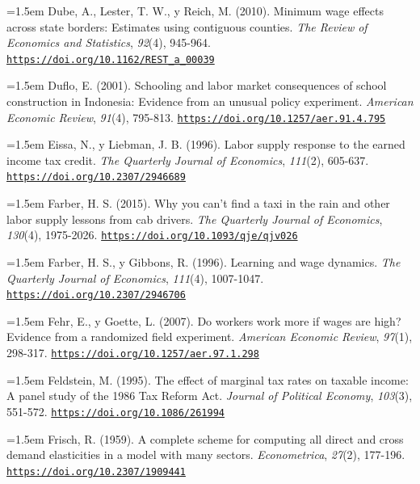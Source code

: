 \documentclass[10pt,a4paper]{article}
\begin{document}
\noindent\hangindent=1.5em Dube, A., Lester, T. W., y Reich, M. (2010). Minimum wage effects across state borders: Estimates using contiguous counties. \textit{The Review of Economics and Statistics}, \textit{92}(4), 945-964. \href{https://doi.org/10.1162/REST_a_00039}{\nolinkurl{https://doi.org/10.1162/REST_a_00039}}

\noindent\hangindent=1.5em Duflo, E. (2001). Schooling and labor market consequences of school construction in Indonesia: Evidence from an unusual policy experiment. \textit{American Economic Review}, \textit{91}(4), 795-813. \href{https://doi.org/10.1257/aer.91.4.795}{\nolinkurl{https://doi.org/10.1257/aer.91.4.795}}

\noindent\hangindent=1.5em Eissa, N., y Liebman, J. B. (1996). Labor supply response to the earned income tax credit. \textit{The Quarterly Journal of Economics}, \textit{111}(2), 605-637. \href{https://doi.org/10.2307/2946689}{\nolinkurl{https://doi.org/10.2307/2946689}}

\noindent\hangindent=1.5em Farber, H. S. (2015). Why you can't find a taxi in the rain and other labor supply lessons from cab drivers. \textit{The Quarterly Journal of Economics}, \textit{130}(4), 1975-2026. \href{https://doi.org/10.1093/qje/qjv026}{\nolinkurl{https://doi.org/10.1093/qje/qjv026}}

\noindent\hangindent=1.5em Farber, H. S., y Gibbons, R. (1996). Learning and wage dynamics. \textit{The Quarterly Journal of Economics}, \textit{111}(4), 1007-1047. \href{https://doi.org/10.2307/2946706}{\nolinkurl{https://doi.org/10.2307/2946706}}

\noindent\hangindent=1.5em Fehr, E., y Goette, L. (2007). Do workers work more if wages are high? Evidence from a randomized field experiment. \textit{American Economic Review}, \textit{97}(1), 298-317. \href{https://doi.org/10.1257/aer.97.1.298}{\nolinkurl{https://doi.org/10.1257/aer.97.1.298}}

\noindent\hangindent=1.5em Feldstein, M. (1995). The effect of marginal tax rates on taxable income: A panel study of the 1986 Tax Reform Act. \textit{Journal of Political Economy}, \textit{103}(3), 551-572. \href{https://doi.org/10.1086/261994}{\nolinkurl{https://doi.org/10.1086/261994}}

\noindent\hangindent=1.5em Frisch, R. (1959). A complete scheme for computing all direct and cross demand elasticities in a model with many sectors. \textit{Econometrica}, \textit{27}(2), 177-196. \href{https://doi.org/10.2307/1909441}{\nolinkurl{https://doi.org/10.2307/1909441}}
\end{document}
